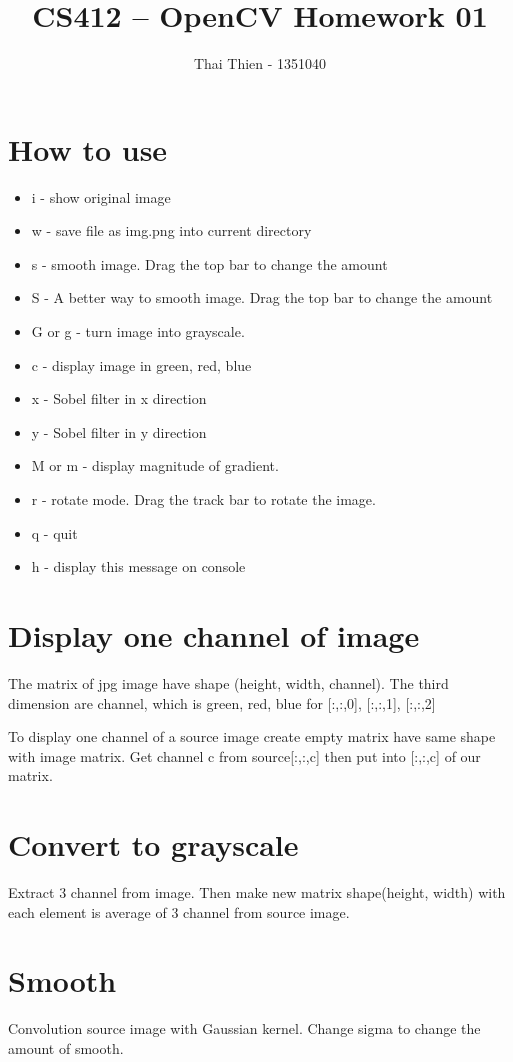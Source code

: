 \documentclass[]{article}
\title{CS412 -- OpenCV Homework 01}
\author{Thai Thien - 1351040}
\begin{document}
\maketitle

\section{How to use}
\begin{itemize}
	\item i - show original image
	\item w - save file as img.png into current directory
	\item s - smooth image. Drag the top bar to change the amount
	\item S - A better way to smooth image. Drag the top bar to change the amount
	\item G or g - turn image into grayscale.
	\item c - display image in green, red, blue
	\item x - Sobel filter in x direction
	\item y - Sobel filter in y direction
	\item M or m - display magnitude of gradient. 
	\item r - rotate mode. Drag the track bar to rotate the image.
	\item q - quit
	\item h - display this message on console
\end{itemize}

\section{Display one channel of image}
The matrix of jpg image have shape (height, width, channel). The third dimension are channel, which is green, red, blue for [:,:,0], [:,:,1], [:,:,2]

To display one channel of a source image create empty matrix have same shape with image matrix. Get channel c from source[:,:,c] then put into [:,:,c] of our matrix.  

\section{Convert to grayscale}
Extract 3 channel from image. Then make new matrix shape(height, width) with each element is average of 3 channel from source image.

\section{Smooth}
Convolution source image with Gaussian kernel. Change sigma to change the amount of smooth.
\end{document}
